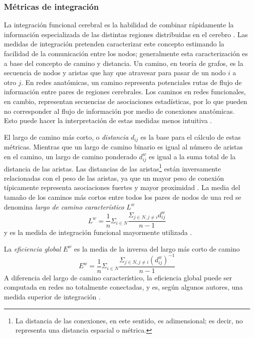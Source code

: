 \subsubsection{Métricas de integración}
La integración funcional cerebral es la habilidad de combinar rápidamente la información especializada de las distintas regiones distribuidas en el cerebro \parencite{Tononi1994}.
Las medidas de integración pretenden caracterizar este concepto estimando la facilidad de la comunicación entre los nodos; generalmente esta caracterización es a base del concepto de camino y distancia.
Un camino, en teoría de grafos, es la secuencia de nodos y aristas que hay que atravesar para pasar de un nodo $i$ a otro $j$.
En redes anatómicas, un camino representa potenciales rutas de flujo de información entre pares de regiones cerebrales.
Los caminos en redes funcionales, en cambio, representan secuencias de asociaciones estadísticas, por lo que pueden no corresponder al flujo de información por medio de conexiones anatómicas. Esto puede hacer la interpretación de estas medidas menos intuitiva \parencite{Rubinov2010}. \par
El largo de camino más corto, o \emph{distancia} $d_{ij}$ es la base para el cálculo de estas métricas.
Mientras que un largo de camino binario es igual al número de aristas en el camino, un largo de camino ponderado $d_{ij}^w$ es igual a la suma total de la distancia de las aristas.
Las distancias de las aristas\footnote{La distancia de las conexiones, en este sentido, es adimensional; es decir, no representa una distancia espacial o métrica.} están inversamente relacionadas con el peso de las aristas, ya que un mayor peso de conexión típicamente representa asociaciones fuertes y mayor proximidad \parencite{Rubinov2010}.
La media del tamaño de los caminos más cortos entre todos los pares de nodos de una red se denomina \emph{largo de camino característico} $L^w$ \parencite{Watts1998}
\begin{equation}\label{eqCPL}
    L^w=\frac{1}{n}\Sigma_{i \in N}\frac{\Sigma_{j \in N,j\neq i}d_{ij}^w}{n-1}
\end{equation}
y es la medida de integración funcional mayormente utilizada \parencite{Rubinov2010}.\par
La \emph{eficiencia global} $E^w$ \parencite{Latora2001} es la media de la inversa del largo más corto de camino
\begin{equation}\label{eqEglob}
    E^w=\frac{1}{n}\Sigma_{i \in N}\frac{\Sigma_{j \in N, j \neq i}(d_{ij}^w)^{-1}}{n-1}
\end{equation}
A diferencia del largo de camino característico, la eficiencia global puede ser computada en redes no totalmente conectadas, y es, según algunos autores, una medida superior de integración \parencite{Achard2007}.

